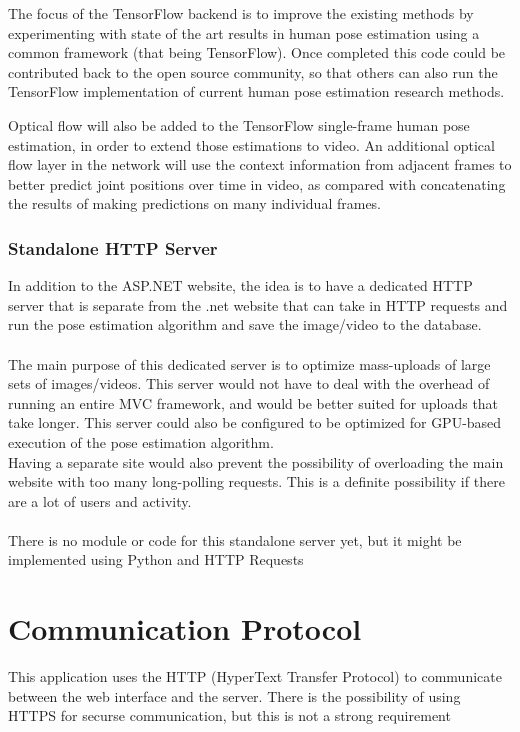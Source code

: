 \documentclass{scrreprt}
\begin{document}
The focus of the TensorFlow backend is to improve the existing methods by
experimenting with state of the art results in human pose estimation using a
common framework (that being TensorFlow). Once completed this code could be
contributed back to the open source community, so that others can also run the
TensorFlow implementation of current human pose estimation research methods.

Optical flow will also be added to the TensorFlow single-frame human pose
estimation, in order to extend those estimations to video. An additional
optical flow layer in the network will use the context information from
adjacent frames to better predict joint positions over time in video, as
compared with concatenating the results of making predictions on many
individual frames.

\subsection{Standalone HTTP Server}

In addition to the ASP.NET website, the idea is to have a dedicated HTTP server that is separate from the .net website that can take in HTTP requests and run the pose estimation algorithm and save the image/video to the database.
\\\\
The main purpose of this dedicated server is to optimize mass-uploads of large sets of images/videos. This server would not have to deal with the overhead of running an entire MVC framework, and would be better suited for uploads that take longer. This server could also be configured to be optimized for GPU-based execution of the pose estimation algorithm.
\\
Having a separate site would also prevent the possibility of overloading the main website with too many long-polling requests. This is a definite possibility if there are a lot of users and activity.
\\\\
There is no module or code for this standalone server yet, but it might be implemented using Python and HTTP Requests


\chapter{Communication Protocol}

This application uses the HTTP (HyperText Transfer Protocol) to communicate between the web interface and the server. There is the possibility of using HTTPS for securse communication, but this is not a strong requirement
\end{document}

